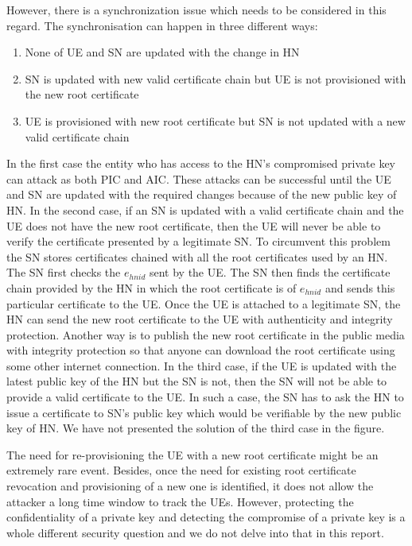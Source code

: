 \documentclass[12pt]{llncs}
\begin{document}
However, there is a synchronization issue which needs to be considered in this regard. The synchronisation can happen in three different ways: 
\begin{enumerate}
\item None of UE and SN are updated with the change in HN
\item SN is updated with new valid certificate chain but UE is not provisioned with the new root certificate
\item UE is provisioned with new root certificate but SN is not updated with a new valid certificate chain
\end{enumerate} 

In the first case the entity who has access to the HN's compromised private key can attack as both PIC and AIC. These attacks can be successful until the UE and SN are updated with the required changes because of the new public key of HN. In the second case, if an SN is updated with a valid certificate chain and the UE does not have the new root certificate, then the UE will never be able to verify the certificate presented by a legitimate SN. To circumvent this problem the SN stores certificates chained with all the root certificates used by an HN. The SN first checks the $e_{hnid}$ sent by the UE. The SN then finds the certificate chain provided by the HN in which the root certificate is of $e_{hnid}$ and sends this particular certificate to the UE. Once the UE is attached to a legitimate SN, the HN can send the new root certificate to the UE with authenticity and integrity protection. Another way is to publish the new root certificate in the public media with integrity protection so that anyone can download the root certificate using some other internet connection. In the third case, if the UE is updated with the latest public key of the HN but the SN is not, then the SN will not be able to provide a valid certificate to the UE. In such a case, the SN has to ask the HN to issue a certificate to SN's public key which would be verifiable by the new public key of HN. We have not presented the solution of the third case in the figure.

The need for re-provisioning the UE with a new root certificate might be an extremely rare event. Besides, once the need for existing root certificate revocation and provisioning of a new one is identified, it does not allow the attacker a long time window to track the UEs. However, protecting the confidentiality of a private key and detecting the compromise of a private key is a whole different security question and we do not delve into that in this report.
\end{document}

